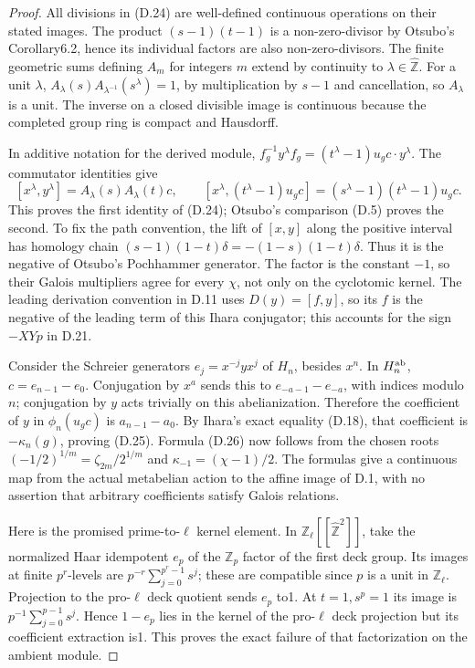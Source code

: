 \begin{proof}
All divisions in (D.24) are well-defined continuous operations on their stated images. The product $(s-1)(t-1)$ is a non-zero-divisor by Otsubo's Corollary6.2, hence its individual factors are also non-zero-divisors. The finite geometric sums defining $A_m$ for integers $m$ extend by continuity to $\lambda\in\widehat{\mathbb Z}$. For a unit $\lambda$,
$A_\lambda(s)A_{\lambda^{-1}}(s^\lambda)=1$, by multiplication by $s-1$ and cancellation, so $A_\lambda$ is a unit. The inverse on a closed divisible image is continuous because the completed group ring is compact and Hausdorff.

In additive notation for the derived module,
$f_g^{-1}y^\lambda f_g=(t^\lambda-1)u_gc\cdot y^\lambda$.
The commutator identities give
\[
 [x^\lambda,y^\lambda]=A_\lambda(s)A_\lambda(t)c,
 \qquad
 [x^\lambda,(t^\lambda-1)u_gc]=(s^\lambda-1)(t^\lambda-1)u_gc.
\]
This proves the first identity of (D.24); Otsubo's comparison (D.5) proves the second. To fix the path convention, the lift of $[x,y]$ along the positive interval has homology chain
$(s-1)(1-t)\delta=-(1-s)(1-t)\delta$. Thus it is the negative of Otsubo's Pochhammer generator. The factor is the constant $-1$, so their Galois multipliers agree for every $\chi$, not only on the cyclotomic kernel. The leading derivation convention in D.11 uses $D(y)=[f,y]$, so its $f$ is the negative of the leading term of this Ihara conjugator; this accounts for the sign $-XYp$ in D.21.

Consider the Schreier generators $e_j=x^{-j}yx^j$ of $H_n$, besides $x^n$. In $H_n^{\rm ab}$,
$c=e_{n-1}-e_0$. Conjugation by $x^a$ sends this to
$e_{-a-1}-e_{-a}$, with indices modulo $n$; conjugation by $y$ acts trivially on this abelianization. Therefore the coefficient of $y$ in $\phi_n(u_gc)$ is $a_{n-1}-a_0$.
By Ihara's exact equality (D.18), that coefficient is $-\kappa_n(g)$, proving (D.25). Formula (D.26) now follows from the chosen roots
$(-1/2)^{1/m}=\zeta_{2m}/2^{1/m}$ and
$\kappa_{-1}=(\chi-1)/2$. The formulas give a continuous map from the actual metabelian action to the affine image of D.1, with no assertion that arbitrary coefficients satisfy Galois relations.

Here is the promised prime-to-$\ell$ kernel element. In
$\mathbb Z_\ell[[\widehat{\mathbb Z}^2]]$, take the normalized Haar idempotent $e_p$ of the $\mathbb Z_p$ factor of the first deck group. Its images at finite $p^r$-levels are
$p^{-r}\sum_{j=0}^{p^r-1}s^j$; these are compatible since $p$ is a unit in $\mathbb Z_\ell$. Projection to the pro-$\ell$ deck quotient sends $e_p$ to1. At $t=1,s^p=1$ its image is $p^{-1}\sum_{j=0}^{p-1}s^j$. Hence $1-e_p$ lies in the kernel of the pro-$\ell$ deck projection but its coefficient extraction is1. This proves the exact failure of that factorization on the ambient module.


\end{proof}
